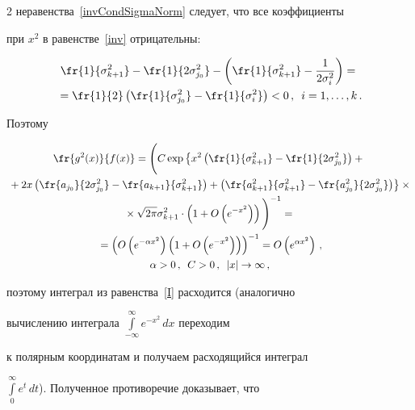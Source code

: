 \begin{multicols}{2}
неравенства~\eqref{invCondSigmaNorm} следует, что все коэффициенты

при $x^2$ в равенстве~\eqref{inv} отрицательны:

\begin{multline*}

\fr{1}{\sigma_{k+1}^2}-\fr{1}{2\sigma_{j_0}^2}-

\left(\fr{1}{\sigma_{k+1}^2}-\frac{1}{2\sigma_i^2}\right)={}\\

{}=

\fr{1}{2}\left(\fr{1}{\sigma_{j_0}^2}-\fr{1}{\sigma_i^2}\right)<0\,,\enskip i=1,\ldots,k\,.

\end{multline*}

Поэтому

\begin{multline*}

\fr{g^2(x)}{f(x)}=\Bigg( C\exp\left\{x^2

\left(\fr{1}{\sigma_{k+1}^2}-\fr{1}{2\sigma_{j_0}^2}\right)

+{}\right.\\

\left.{}+2x\left(\fr{a_{j_0}}{2\sigma_{j_0}^2}-\fr{a_{k+1}}{\sigma_{k+1}^2}\right)

+\left(\fr{a_{k+1}^2}{\sigma_{k+1}^2}-\fr{a_{j_0}^2}{2\sigma_{j_0}^2}\right)\right\}

\times{}\\

{}\times\sqrt{2\pi}\sigma^2_{k+1}\cdot

\left(1+O\left(e^{-x^2}\right)\right)\Bigg)^{-1}={}\\

{}=\left({O\left(e^{-\alpha

x^2}\right)\left(1+O\left(e^{-x^2}\right)\right)}\right)^{-1}=

O\left(e^{\alpha x^2}\right)\,,\\ \alpha>0\,,\enskip C>0\,,\enskip    |x|\to\infty\,,

\end{multline*}

поэтому интеграл из равенства~\eqref{I} расходится (аналогично

вычислению интеграла $\int\limits_{-\infty}^\infty e^{-x^2}\,dx$ переходим

к полярным координатам и получаем расходящийся интеграл

$\int\limits_0^\infty e^t\,dt$). Полученное противоречие доказывает, что


\end{multicols}
